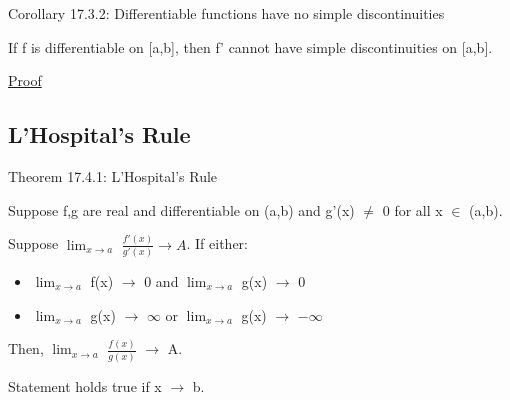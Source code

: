     \vspace{0.5cm}

{ \color{orange} Corollary 17.3.2:
Differentiable functions have no simple discontinuities }

    \begin{adjustbox}{minipage=14cm, right, vspace=0.1cm 0cm}
        If f is differentiable on [a,b], then f' cannot have simple discontinuities
        on [a,b].
    \end{adjustbox}

{ \color{magenta} \underline{Proof} }


\newpage





\subsection{ L'Hospital's Rule }

{ \color{red} Theorem 17.4.1: L'Hospital's Rule }

    \begin{adjustbox}{minipage=14cm, right, vspace=0.1cm 0cm}
        Suppose f,g are real and differentiable on (a,b) and g'(x) $\not =$ 0
        for all x $\in$ (a,b).
        
        Suppose $\lim_{x \rightarrow a}$ $\frac{f'(x)}{g'(x)} \rightarrow A$.
        If either:
        
        \begin{itemize}[leftmargin=1cm, itemsep=0.1cm]
            \item                        
                $\lim_{x \rightarrow a}$ f(x) $\rightarrow$ 0 and
                $\lim_{x \rightarrow a}$ g(x) $\rightarrow$ 0

            \item
                $\lim_{x \rightarrow a}$ g(x) $\rightarrow$ $\infty$ or
                $\lim_{x \rightarrow a}$ g(x) $\rightarrow$ $-\infty$
        \end{itemize}

        Then, $\lim_{x \rightarrow a}$ $\frac{f(x)}{g(x)}$ $\rightarrow$ A.

        Statement holds true if x $\rightarrow$ b.
    \end{adjustbox}

